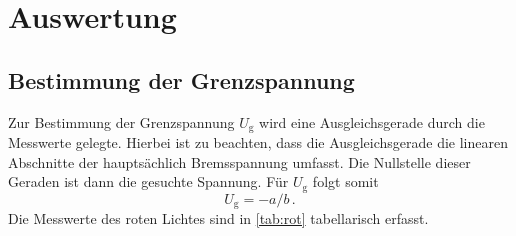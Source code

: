 \section{Auswertung}
\label{sec:Auswertung}

%

\subsection{Bestimmung der Grenzspannung}
\label{sec:Auswertunga}

Zur Bestimmung der Grenzspannung $U_{\text{g}}$ wird eine Ausgleichsgerade durch die Messwerte gelegte. Hierbei ist zu beachten, dass die Ausgleichsgerade die linearen Abschnitte der hauptsächlich Bremsspannung umfasst.
Die Nullstelle dieser Geraden ist dann die gesuchte Spannung. Für $U_{\text{g}}$ folgt somit
\begin{equation}
    U_{\text{g}}=-a/b\, .
    \label{eqn:U_g}
\end{equation}
Die Messwerte des roten Lichtes sind in \autoref{tab:rot} tabellarisch erfasst.
